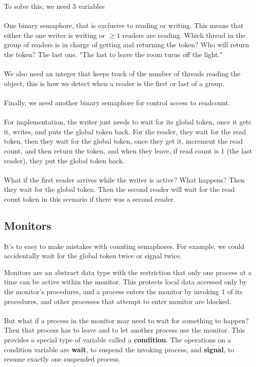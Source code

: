 \documentclass{article}
\begin{document}
To solve this, we need 3 variables
\\
\\
One binary semaphore, that is exclusive to reading or writing. This means that either the one writer is writing or $\geq 1$ readers are reading. Which thread in the group of readers is in charge of getting and returning the token? Who will return the token? The last one. "The last to leave the room turns off the light."
\\
\\
We also need an integer that keeps track of the number of threads reading the object, this is how we detect when a reader is the first or last of a group.
\\
\\
Finally, we need another binary semaphore for control access to readcount.
\\
\\
For implementation, the writer just needs to wait for its global token, once it gets it, writes, and puts the global token back. For the reader, they wait  for the read token, then they wait for the global token, once they get it, increment the read count, and then return the token, and when they leave, if read count is 1 (the last reader), they put the global token back.
\\
\\
What if the first reader arrives while the writer is active? What happens? Then they wait for the global token. Then the second reader will wait for the read count token in this scenario if there was a second reader.

\subsection{Monitors}

It's to easy to make mistakes with counting semaphores. For example, we could accidentally wait for the global token twice or signal twice.

Monitors are an abstract data type with the restriction that only one process at a time can be active within the monitor. This protects local data accessed only by the monitor's procedures, and a process enters the monitor by invoking 1 of its procedures, and other processes that attempt to enter monitor are blocked.\\
\\
But what if a process in the monitor may need to wait for something to happen? Then that process has to leave and to let another process use the monitor. This provides a special type of variable called a \textbf{condition}. The operations on a condition variable are \textbf{wait}, to suspend the invoking process, and \textbf{signal}, to resume exactly one suspended process.
\end{document}
